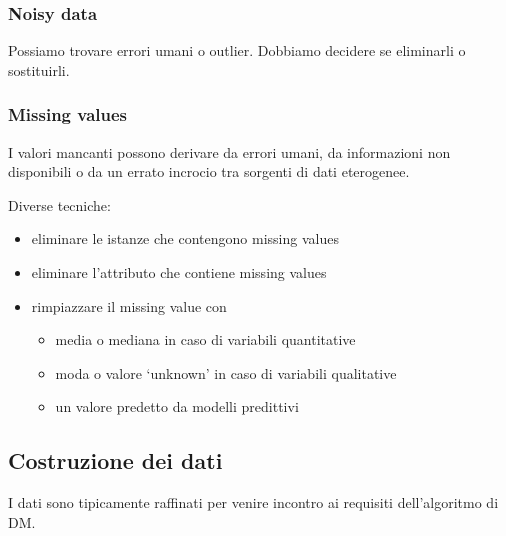 \documentclass[11pt,onecolumn,a4paper,oneside]{book}
\begin{document}
\subsubsection{Noisy data}
Possiamo trovare errori umani o outlier. Dobbiamo decidere se eliminarli o sostituirli.

\subsubsection{Missing values}
I valori mancanti possono derivare da errori umani, da informazioni non disponibili o da un errato incrocio tra sorgenti di dati eterogenee.

Diverse tecniche:
\begin{itemize}
\item eliminare le istanze che contengono missing values
\item eliminare l'attributo che contiene missing values
\item rimpiazzare il missing value con
\begin{itemize}
\item media o mediana in caso di variabili quantitative
\item moda o valore `unknown' in caso di variabili qualitative
\item un valore predetto da modelli predittivi
\end{itemize}
\end{itemize}

\subsection{Costruzione dei dati}


I dati sono tipicamente raffinati per venire incontro ai requisiti dell'algoritmo di DM.
\end{document}
